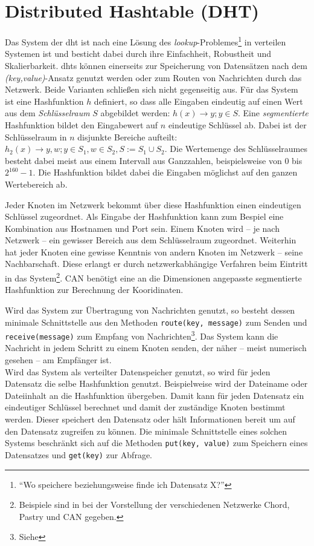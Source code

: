 \chapter{Distributed Hashtable (DHT)}
\label{chap:dht}

Das System der \acf{dht} ist nach \cite{Wehrle2005} eine Lösung des \emph{lookup}-Problemes\footnote{\enquote{Wo speichere beziehungsweise finde ich Datensatz X?}} in verteilen Systemen ist und besticht dabei durch ihre Einfachheit, Robustheit und Skalierbarkeit. \acp{dht} können einerseits zur Speicherung von Datensätzen nach dem \emph{(key,value)}-Ansatz genutzt werden oder zum Routen von Nachrichten durch das Netzwerk. Beide Varianten schließen sich nicht gegenseitig aus. Für das System ist eine Hashfunktion $h$ definiert, so dass alle Eingaben eindeutig auf einen Wert aus dem \emph{Schlüsselraum} $S$ abgebildet werden: $h(x) \rightarrow y; y \in S$. Eine \emph{segmentierte} Hashfunktion bildet den Eingabewert auf $n$ eindeutige Schlüssel ab. Dabei ist der Schlüsselraum in $n$ disjunkte Bereiche aufteilt: $h_2(x) \rightarrow y,w; y \in S_1, w \in S_2, S := S_1 \cup S_2$. Die Wertemenge des Schlüsselraumes besteht dabei meist aus einem Intervall aus Ganzzahlen, beispielsweise von $0$ bis $2^{160}-1$. Die Hashfunktion bildet dabei die Eingaben möglichst auf den ganzen Wertebereich ab.

Jeder Knoten im Netzwerk bekommt über diese Hashfunktion einen eindeutigen Schlüssel zugeordnet. Als Eingabe der Hashfunktion kann zum Bespiel eine Kombination aus Hostnamen und Port sein. Einem Knoten wird -- je nach Netzwerk -- ein gewisser Bereich aus dem Schlüsselraum zugeordnet. Weiterhin hat jeder Knoten eine gewisse Kenntnis von andern Knoten im Netzwerk -- seine Nachbarschaft. Diese erlangt er durch netzwerkabhängige Verfahren beim Eintritt in das System\footnote{Beispiele sind in  bei der Vorstellung der verschiedenen Netzwerke Chord, Pastry und CAN gegeben.}. CAN benötigt eine an die Dimensionen angepasste segmentierte Hashfunktion zur Berechnung der Kooridinaten.

Wird das System zur Übertragung von Nachrichten genutzt, so besteht dessen minimale Schnittstelle aus den Methoden \texttt{route(key, message)} zum Senden und \texttt{receive(message)} zum Empfang von Nachrichten\footnote{Siehe }. Das System kann die Nachricht in jedem Schritt zu einem Knoten senden, der näher -- meist numerisch gesehen -- am Empfänger ist.\\
Wird das System als verteilter Datenspeicher genutzt, so wird für jeden Datensatz die selbe Hashfunktion genutzt. Beispielweise wird der Dateiname oder Dateiinhalt an die Hashfunktion übergeben. Damit kann für jeden Datensatz ein eindeutiger Schlüssel berechnet und damit der zuständige Knoten bestimmt werden. Dieser speichert den Datensatz oder hält Informationen bereit um auf den Datensatz zugreifen zu können. Die minimale Schnittstelle eines solchen Systems beschränkt sich auf die Methoden \texttt{put(key, value)} zum Speichern eines Datensatzes und \texttt{get(key)} zur Abfrage.
